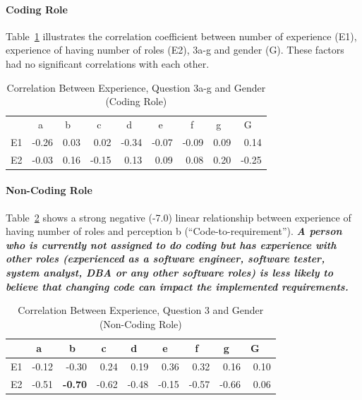 \documentclass[conference]{IEEEtran}
\begin{document}
\paragraph{Coding Role}

Table~\ref{table6} illustrates the correlation coefficient between
number of experience (E1), experience of having number of roles (E2),
3a-g and gender (G). These factors had no significant correlations
with each other.

\begin{table}[ht]
\centering
\caption{Correlation Between Experience, Question 3a-g and Gender (Coding Role) }
\label{table6}
\begin{tabular}{|c|rrrrrrr|r|}
\hline
\rowcolor{lightgray} & a~~ & b~~ & c~~ & d~~ & e~~ & f~~ & g~~ & G~~ \\
E1 & -0.26   & 0.03 & 0.02 & -0.34 & -0.07 & -0.09 & 0.09 & 0.14 \\ 
\hline
E2 & -0.03   & 0.16 & -0.15  & 0.13 & 0.09 & 0.08 & 0.20 & -0.25 \\
\hline
\end{tabular}
\end{table}



\paragraph{Non-Coding Role}

Table~\ref{table7} shows a strong negative (-7.0) linear relationship
between experience of having number of roles and perception b
(``Code-to-requirement''). \textbf{\textit{A person who is currently
    not assigned to do coding but has experience with other roles
    (experienced as a software engineer, software tester, system
    analyst, DBA or any other software roles) is less likely to
    believe that changing code can impact the implemented
    requirements.}}

\begin{table}[ht]
\caption{Correlation Between Experience, Question 3 and Gender (Non-Coding Role) }
\label{table7}
\begin{tabular}{|c|rrrrrrr|r|}
\hline
\rowcolor{lightgray} & a~~ & b~~ & c~~ & d~~ & e~~ & f~~ & g~~ & G~~ \\
\hline
E1 & -0.12   & -0.30 & 0.24 & 0.19 & 0.36 & 0.32 & 0.16 & 0.10 \\ 
\hline
E2 & -0.51   & \textbf{-0.70} & -0.62  & -0.48 & -0.15 & -0.57 & -0.66 & 0.06 \\
\hline
\end{tabular}
\end{table}
\end{document}
